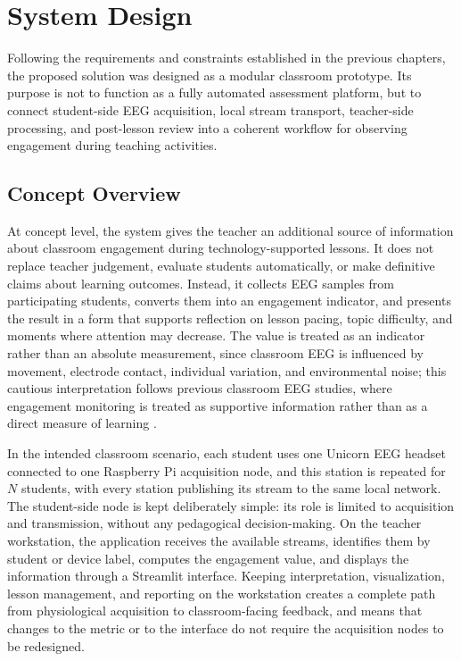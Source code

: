 \chapter{System Design}\label{cap:sysdes}
Following the requirements and constraints established in the previous chapters, the proposed solution was designed as a modular classroom prototype. Its purpose is not to function as a fully automated assessment platform, but to connect student-side EEG acquisition, local stream transport, teacher-side processing, and post-lesson review into a coherent workflow for observing engagement during teaching activities.



\section{Concept Overview}\label{sect:concov}
At concept level, the system gives the teacher an additional source of information about classroom engagement during technology-supported lessons. It does not replace teacher judgement, evaluate students automatically, or make definitive claims about learning outcomes. Instead, it collects EEG samples from participating students, converts them into an engagement indicator, and presents the result in a form that supports reflection on lesson pacing, topic difficulty, and moments where attention may decrease. The value is treated as an indicator rather than an absolute measurement, since classroom EEG is influenced by movement, electrode contact, individual variation, and environmental noise; this cautious interpretation follows previous classroom EEG studies, where engagement monitoring is treated as supportive information rather than as a direct measure of learning \cite{Poulsen2017,Apicella2022,Xu2018,BustosLopez2022}.


In the intended classroom scenario, each student uses one Unicorn EEG headset connected to one Raspberry Pi acquisition node, and this station is repeated for \(N\) students, with every station publishing its stream to the same local network. The student-side node is kept deliberately simple: its role is limited to acquisition and transmission, without any pedagogical decision-making. On the teacher workstation, the application receives the available streams, identifies them by student or device label, computes the engagement value, and displays the information through a Streamlit interface. Keeping interpretation, visualization, lesson management, and reporting on the workstation creates a complete path from physiological acquisition to classroom-facing feedback, and means that changes to the metric or to the interface do not require the acquisition nodes to be redesigned.


